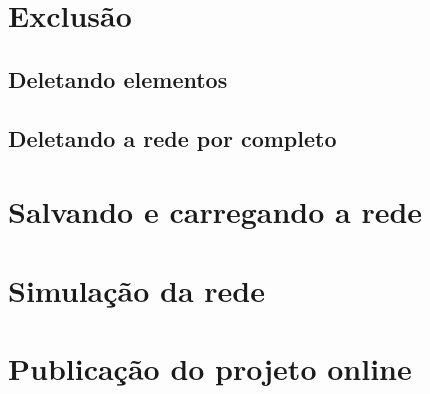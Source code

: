 \documentclass[
	12pt,				%
	openright,			%
	oneside,			%
	a4paper,			%
	english,			%
	brazil				%
	]{abntex2}
\begin{document}
\section{Exclusão}

\subsection*{Deletando elementos}

\subsection*{Deletando a rede por completo}

\section{Salvando e carregando a rede}

\section{Simulação da rede} \label{cap:simulation}

\section{Publicação do projeto online}





\end{document}
